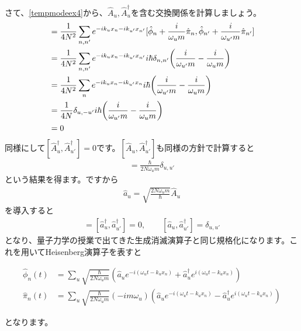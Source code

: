 \documentclass[report,paper=a4, fontsize=12pt, line_length=16cm, number_of_lines=33,dvipdfmx]{jlreq}
\newenvironment{important}{\begin{tcolorbox}[
  colback = white,
  colframe = red!35,
  boxrule = 2mm,
  fonttitle = \bfseries,
  after = \noindent] }{\end{tcolorbox}}
\numberwithin{equation}{chapter}
\newcommand{\phih}{\hat{\phi}}
\newcommand{\pih}{\hat{\pi}}
\newcommand{\Ah}{\widehat{A}}
\newcommand{\ah}{\hat{a}}
\begin{document}
さて、\eqref{tempmodeex4}から、$\Ah_u,\Ah_u^{\dag}$を含む交換関係を計算しましょう。
\begin{align}
[\Ah_u,\Ah_{u'}]
&=\frac{1}{4N^2}\sum_{n,n'}e^{-ik_ux_n-ik_{u'}x_{n'}}[\phih_n+\frac{i}{\omega_{u}m}\pih_n,\phih_{n'}+\frac{i}{\omega_{u'}m}\pih_{n'}]\nonumber\\
&=\frac{1}{4N^2}\sum_{n,n'}e^{-ik_ux_n-ik_{u'}x_{n'}}i\hbar\delta_{n,n'}\qty(\frac{i}{\omega_{u'}m}-\frac{i}{\omega_{u}m})\nonumber\\
&=\frac{1}{4N^2}\sum_{n}e^{-ik_ux_n-ik_{u'}x_{n}}i\hbar\qty(\frac{i}{\omega_{u'}m}-\frac{i}{\omega_{u}m})\nonumber\\
&=\frac{1}{4N}\delta_{u,-u'}i\hbar\qty(\frac{i}{\omega_{u'}m}-\frac{i}{\omega_{u}m})\nonumber\\
&=0
\end{align}
同様にして$[\Ah_u^{\dag},\Ah_{u'}^{\dag}]=0$です。$[\Ah_u,\Ah_{u'}^{\dag}]$も同様の方針で計算すると
\begin{align}
  [\Ah_u,\Ah_{u'}^{\dag}]=\frac{\hbar}{2N\omega_{u}m}\delta_{u,u'}
\end{align}
という結果を得ます。ですから
\begin{align}
  \ah_{u}=\sqrt{\frac{2N\omega_um}{\hbar}}\Ah_{u}
\end{align}
を導入すると
\begin{align}
  [\ah_u,\ah_{u'}]=[\ah_u^{\dag},\ah_{u'}^{\dag}]=0,\qquad
  [\ah_u,\ah_{u'}^{\dag}]=\delta_{u,u'}
\end{align}
となり、量子力学の授業で出てきた生成消滅演算子と同じ規格化になります。これを用いてHeisenberg演算子を表すと
\begin{important}
  \begin{align}
    \phih_n(t)&=\sum_{u}\sqrt{\frac{\hbar}{2N\omega_um}}
    (\ah_ue^{-i(\omega_u t -k_ux_n)}
    +\ah_u^{\dag}e^{i(\omega_u t -k_ux_n)})\label{discretefield}\\
    \pih_n(t)&=\sum_{u}\sqrt{\frac{\hbar}{2N\omega_um}}
    (-im\omega_{u})
    (\ah_ue^{-i(\omega_u t -k_ux_n)}
    -\ah_u^{\dag}e^{i(\omega_u t -k_ux_n)})\label{discretemomentum}
  \end{align}
\end{important}
となります。
\end{document}

